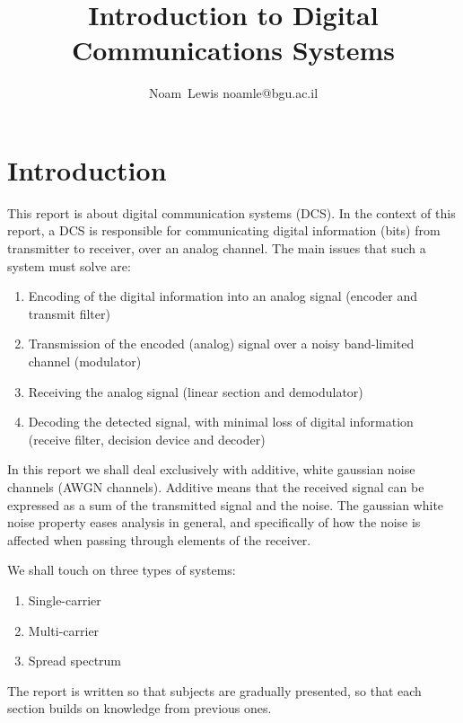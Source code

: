 \documentclass[onecolumn,x11names,technote,twoside,a4paper,10pt,english]{IEEEtran}
\begin{document}
\title{Introduction to Digital Communications Systems}
\author{Noam~Lewis noamle@bgu.ac.il}

\maketitle
\clearpage
\section{Introduction}
This report is about  digital communication systems (DCS). In the context of this report, a DCS is responsible for communicating digital information (bits) from transmitter to receiver, over an analog channel. The main issues that such a system must solve are:
\begin{enumerate}
\item Encoding of the digital information into an analog signal (encoder and transmit filter)
\item Transmission of the encoded (analog) signal over a noisy band-limited channel (modulator)
\item Receiving the analog signal  (linear section and demodulator)
\item Decoding the detected signal, with minimal loss of digital information (receive filter, decision device and decoder)
\end{enumerate}

In this report we shall deal exclusively with additive, white gaussian noise channels (AWGN channels). Additive means that the received signal can be expressed as a sum of the transmitted signal and the noise. The gaussian white noise property eases analysis in general, and specifically of how the noise is affected when passing through elements of the receiver.

We shall touch on three types of systems:
\begin{enumerate}
\item Single-carrier
\item Multi-carrier
\item Spread spectrum
\end{enumerate}
The report is written so that subjects are gradually presented, so that each section builds on knowledge from previous ones.




\clearpage


\end{document}
